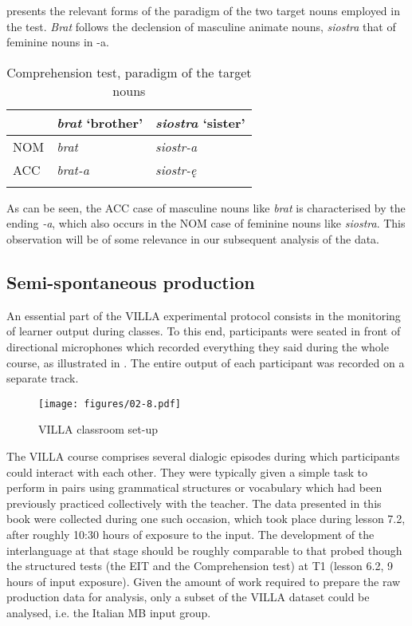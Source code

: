  presents the relevant forms of the paradigm of the two target nouns employed in the test. \textit{Brat} follows the declension of masculine animate nouns, \textit{siostra} that of feminine nouns in -a.

\begin{table}
    \begin{tabularx}{\textwidth}{XXl}
    \lsptoprule
           & \textit{brat} ‘brother’ & \textit{siostra} ‘sister’\\
    \midrule
        NOM & \textit{brat} & \textit{siostr-a}\\
        ACC & \textit{brat-a} & \textit{siostr-ę}\\
    \lspbottomrule
    \end{tabularx}
    \caption{Comprehension test, paradigm of the target nouns}
    \label{tab:02:15}
\end{table}

As can be seen, the ACC case of masculine nouns like \textit{brat} is characterised by the ending \textit{{}-a}, which also occurs in the NOM case of feminine nouns like \textit{siostra}. This observation will be of some relevance in our subsequent analysis of the data.

\subsection{Semi-spontaneous production}\label{sec:02:4.5}

An essential part of the VILLA experimental protocol consists in the monitoring of learner output during classes. To this end, participants were seated in front of directional microphones which recorded everything they said during the whole course, as illustrated in . The entire output of each participant was recorded on a separate track.

\begin{figure}
    \texttt{[image: figures/02-8.pdf]}
    \caption{VILLA classroom set-up}
    \label{fig:02:8}
\end{figure}

The VILLA course comprises several dialogic episodes during which participants could interact with each other. They were typically given a simple task to perform in pairs using grammatical structures or vocabulary which had been previously practiced collectively with the teacher. The data presented in this book were collected during one such occasion, which took place during lesson 7.2, after roughly 10:30 hours of exposure to the input. The development of the interlanguage at that stage should be roughly comparable to that probed though the structured tests (the EIT and the Comprehension test) at T1 (lesson 6.2, 9 hours of input exposure). Given the amount of work required to prepare the raw production data for analysis, only a subset of the VILLA dataset could be analysed, i.e. the Italian MB input group.

